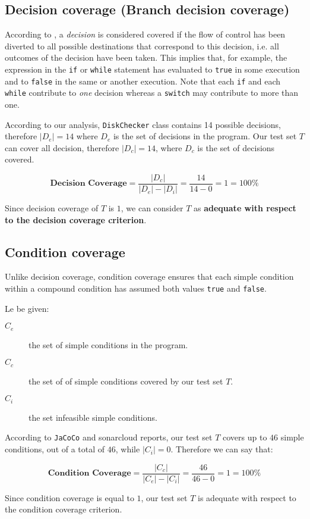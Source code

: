 \documentclass[conference]{IEEEtran}
\newcommand{\abs}[1]{\left|#1\right|}
\begin{document}
\subsection{Decision coverage (Branch decision coverage)}

According to \cite{FoundationSoftwareTesting}, a \textit{decision} is considered covered if the flow of control has been diverted to all possible destinations that correspond to this decision, i.e. all outcomes of the decision have been taken. This implies that, for example, the expression in the \texttt{if} or \texttt{while} statement has evaluated to \texttt{true} in some execution and to \texttt{false} in the same or another execution. Note that each \texttt{if} and each \texttt{while} contribute to \textit{one} decision whereas a \texttt{switch} may contribute to more than one.

According to our analysis, \texttt{DiskChecker} class contains 14 possible decisions, therefore $\abs{D_e} = 14$ where $D_e$ is the set of decisions in the program. Our test set $T$ can cover all decision, therefore $\abs{D_c} = 14$, where $D_c$ is the set of decisions covered.

\begin{equation} 
\textbf{Decision Coverage} = \dfrac{\abs{D_c}}{\abs{D_e} - \abs{D_i}} = \dfrac{14}{14-0} = 1 = 100\%
\end{equation}

Since decision coverage of $T$ is $1$, we can consider $T$ as \textbf{adequate with respect to the decision coverage criterion}.

\subsection{Condition coverage}

Unlike decision coverage, condition coverage ensures that each simple condition within a compound condition has assumed both values \texttt{true} and \texttt{false}. 

Le be given:

\begin{description}
\item[$C_e$] the set of simple conditions in the program.
\item[$C_c$] the set of of simple conditions covered  by our test set $T$.
\item[$C_i$] the set infeasible simple conditions.
\end{description}

According to \texttt{JaCoCo} and sonarcloud reports, our test set $T$ covers up to $46$ simple conditions, out of a total of $46$, while $\abs{C_i} = 0$. Therefore we can say that:

\begin{equation} 
\textbf{Condition Coverage} = \dfrac{\abs{C_c}}{\abs{C_e} - \abs{C_i}} = \dfrac{46}{46-0} = 1 = 100\%
\end{equation}

Since condition coverage is equal to $1$, our test set $T$ is adequate with respect to the condition coverage criterion. 




\end{document}
